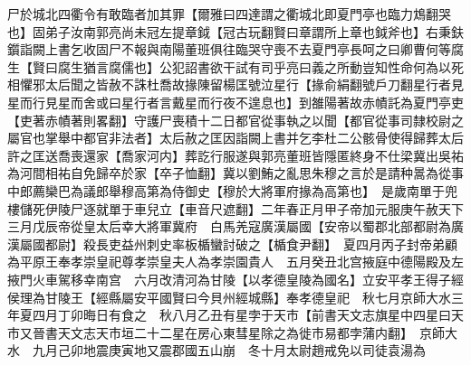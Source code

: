 尸於城北四衢令有敢臨者加其罪【爾雅曰四達謂之衢城北即夏門亭也臨力鴆翻哭也】固弟子汝南郭亮尚未冠左提章鉞【冠古玩翻賢曰章謂所上章也鉞斧也】右秉鈇鑕詣闕上書乞收固尸不報與南陽董班俱往臨哭守喪不去夏門亭長呵之曰卿曹何等腐生【賢曰腐生猶言腐儒也】公犯詔書欲干試有司乎亮曰義之所動豈知性命何為以死相懼邪太后聞之皆赦不誅杜喬故掾陳留楊匡號泣星行【掾俞絹翻號戶刀翻星行者見星而行見星而舍或曰星行者言戴星而行夜不遑息也】到雒陽著故赤幘託為夏門亭吏【吏著赤幘著則畧翻】守護尸喪積十二日都官從事執之以聞【都官從事司隸校尉之屬官也掌舉中都官非法者】太后赦之匡因詣闕上書并乞李杜二公骸骨使得歸葬太后許之匡送喬喪還家【喬家河内】葬訖行服遂與郭亮董班皆隱匿終身不仕梁冀出吳祐為河間相祐自免歸卒於家【卒子恤翻】冀以劉鮪之亂思朱穆之言於是請种暠為從事中郎薦欒巴為議郎舉穆高第為侍御史【穆於大將軍府掾為高第也】　是歲南單于兜樓儲死伊陵尸逐就單于車兒立【車音尺遮翻】二年春正月甲子帝加元服庚午赦天下　三月戊辰帝從皇太后幸大將軍冀府　白馬羌寇廣漢屬國【安帝以蜀郡北部都尉為廣漢屬國都尉】殺長吏益州刺史率板楯蠻討破之【楯食尹翻】　夏四月丙子封帝弟顧為平原王奉孝崇皇祀尊孝崇皇夫人為孝崇園貴人　五月癸丑北宫掖庭中德陽殿及左掖門火車駕移幸南宫　六月改清河為甘陵【以孝德皇陵為國名】立安平孝王得子經侯理為甘陵王【經縣屬安平國賢曰今貝州經城縣】奉孝德皇祀　秋七月京師大水三年夏四月丁卯晦日有食之　秋八月乙丑有星孛于天市【前書天文志旗星中四星曰天市又晉書天文志天市垣二十二星在房心東彗星除之為徙市易都孛蒲内翻】　京師大水　九月己卯地震庚寅地又震郡國五山崩　冬十月太尉趙戒免以司徒袁湯為

